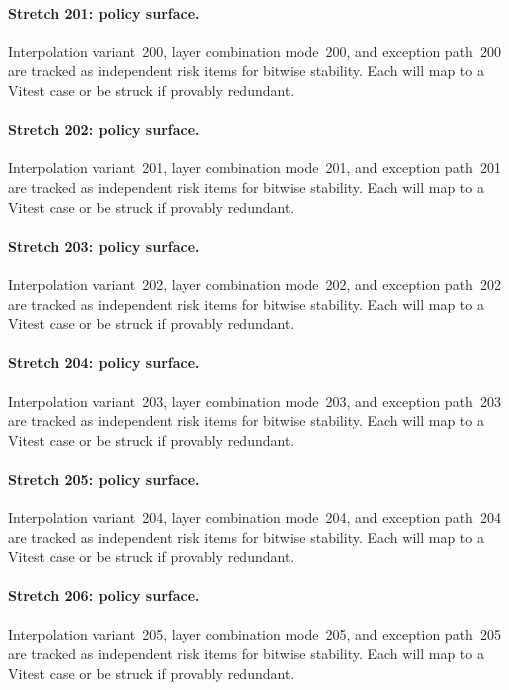 \documentclass[sigconf,nonacm]{acmart}
\begin{document}
\paragraph{Stretch 201: policy surface.}
Interpolation variant~200, layer combination mode~200, and exception path~200 are tracked as independent risk items for bitwise stability. Each will map to a Vitest case or be struck if provably redundant. %

\paragraph{Stretch 202: policy surface.}
Interpolation variant~201, layer combination mode~201, and exception path~201 are tracked as independent risk items for bitwise stability. Each will map to a Vitest case or be struck if provably redundant. %

\paragraph{Stretch 203: policy surface.}
Interpolation variant~202, layer combination mode~202, and exception path~202 are tracked as independent risk items for bitwise stability. Each will map to a Vitest case or be struck if provably redundant. %

\paragraph{Stretch 204: policy surface.}
Interpolation variant~203, layer combination mode~203, and exception path~203 are tracked as independent risk items for bitwise stability. Each will map to a Vitest case or be struck if provably redundant. %

\paragraph{Stretch 205: policy surface.}
Interpolation variant~204, layer combination mode~204, and exception path~204 are tracked as independent risk items for bitwise stability. Each will map to a Vitest case or be struck if provably redundant. %

\paragraph{Stretch 206: policy surface.}
Interpolation variant~205, layer combination mode~205, and exception path~205 are tracked as independent risk items for bitwise stability. Each will map to a Vitest case or be struck if provably redundant. %
\end{document}
